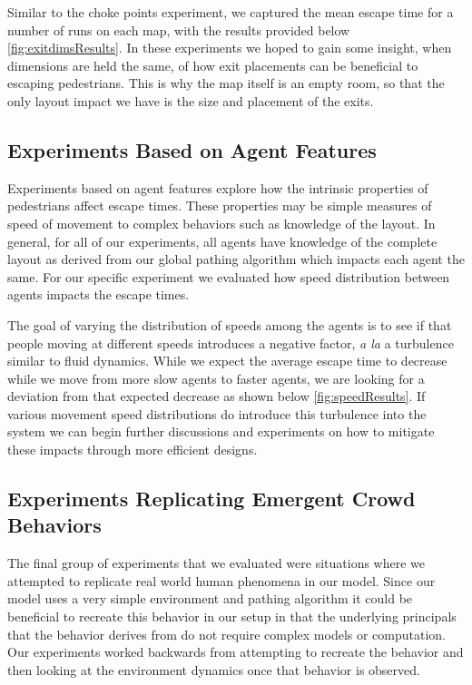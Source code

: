 \documentclass[12pt,letterpaper]{article}
\begin{document}
Similar to the choke points experiment, we captured the mean escape time for a number of runs on each map, with the results provided below \ref{fig:exitdimsResults}.  In these experiments we hoped to gain some insight, when dimensions are held the same, of how exit placements can be beneficial to escaping pedestrians.  This is why the map itself is an empty room, so that the only layout impact we have is the size and placement of the exits.

\subsection{Experiments Based on Agent Features} \label{expAgent}

Experiments based on agent features explore how the intrinsic properties of pedestrians affect escape times.  These properties may be simple measures of speed of movement to complex behaviors such as knowledge of the layout.  In general, for all of our experiments, all agents have knowledge of the complete layout as derived from our global pathing algorithm which impacts each agent the same.  For our specific experiment we evaluated how speed distribution between agents impacts the escape times.  

The goal of varying the distribution of speeds among the agents is to see if that people moving at different speeds introduces a negative factor, \emph{a la} a turbulence similar to fluid dynamics.  While we expect the average escape time to decrease while we move from more slow agents to faster agents, we are looking for a deviation from that expected decrease as shown below \ref{fig:speedResults}.  If various movement speed distributions do introduce this turbulence into the system we can begin further discussions and experiments on how to mitigate these impacts through more efficient designs.


\subsection{Experiments Replicating Emergent Crowd Behaviors} \label{emergentBehavior}

The final group of experiments that we evaluated were situations where we attempted to replicate real world human phenomena in our model.  Since our model uses a very simple environment and pathing algorithm it could be beneficial to recreate this behavior in our setup in that the underlying principals that the behavior derives from do not require complex models or computation.  Our experiments worked backwards from attempting to recreate the behavior and then looking at the environment dynamics once that behavior is observed. 
\end{document}

